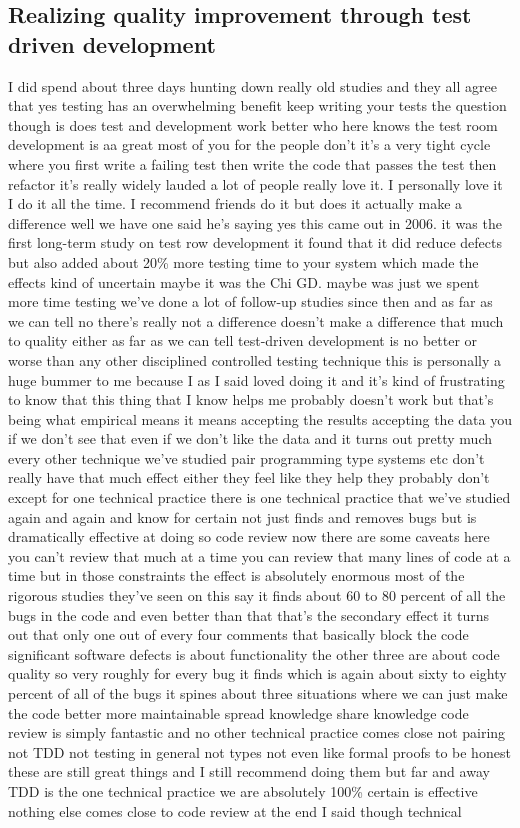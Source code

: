 \documentclass[conference, compsoc, twoside]{IEEEtran}
\begin{document}
\subsection{Realizing quality improvement through test driven development}
I did spend about three days hunting down really old studies and they all agree that yes testing has an overwhelming benefit keep writing your tests the question though is does test and development work better
who here knows the test room development is aa great most of you for the people don't it's a very tight cycle
where you first write a failing test then write the code that passes the test then refactor it's really widely lauded a lot of people really love it. I personally love it I do it all the time.
I recommend friends do it but does it actually make a difference well we have one said he's saying yes this came out in 2006. it was the first long-term study on test row development it found that it did reduce defects but also added about 20\% more testing time to your system which made the effects kind of uncertain maybe it was the Chi GD.  maybe was just we spent more time testing we've done a lot of follow-up studies since then and as far as we can tell no there's really not a difference doesn't make a difference that much to quality either as far as we can tell test-driven development is no better or worse than any other disciplined controlled testing technique this is personally a huge bummer to me because I as I said loved doing it and it's kind of frustrating to know that this thing that I know helps me probably doesn't work but that's being what empirical means it means accepting the results accepting the data you if we don't see that even if we don't like the data and it turns out pretty much every other technique we've studied pair programming type systems etc don't really have that much effect either they feel like they help they probably don't except for one technical practice there is one technical practice that we've studied again and again and know for certain not just finds and removes bugs but is dramatically effective at doing so code review now there are some caveats here you can't review that much at a time you can review that many lines of code at a time but in those constraints the effect is absolutely enormous most of the rigorous studies they've seen on this say it finds about 60 to 80 percent of all the bugs in the code and even better than that that's the secondary effect it turns out that only one out of every four comments that basically block the code significant software defects is about functionality the other three are about code quality so very roughly for every bug it finds which is again about sixty to eighty percent of all of the bugs it spines about three situations where we can just make the code better more maintainable spread knowledge share knowledge code review is simply fantastic and no other technical practice comes close not pairing not TDD not testing in general not types not even like formal proofs to be honest these are still great things and I still recommend doing them but far and away TDD is the one technical practice we are absolutely 100\% certain is effective nothing else comes close to code review at the end I said though technical 
\end{document}
